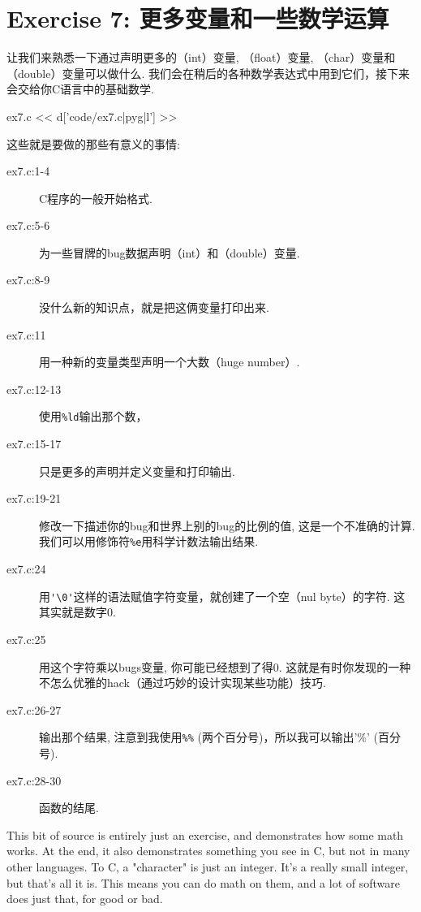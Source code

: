 \chapter{Exercise 7: 更多变量和一些数学运算}

让我们来熟悉一下通过声明更多的（int）变量, （float）变量, （char）变量和（double）变量可以做什么. 我们会在稍后的各种数学表达式中用到它们，接下来会交给你C语言中的基础数学.

\begin{code}{ex7.c}
<< d['code/ex7.c|pyg|l'] >>
\end{code}

这些就是要做的那些有意义的事情:

\begin{description}
\item[ex7.c:1-4] C程序的一般开始格式.
\item[ex7.c:5-6] 为一些冒牌的bug数据声明（int）和（double）变量.
\item[ex7.c:8-9] 没什么新的知识点，就是把这俩变量打印出来.
\item[ex7.c:11] 用一种新的变量类型声明一个大数（huge number）.
\item[ex7.c:12-13] 使用\verb|%ld|输出那个数， %
\item[ex7.c:15-17] 只是更多的声明并定义变量和打印输出.
\item[ex7.c:19-21] 修改一下描述你的bug和世界上别的bug的比例的值, 这是一个不准确的计算.  我们可以用修饰符\verb|%e|用科学计数法输出结果.
\item[ex7.c:24] 用\verb|'\0'|这样的语法赋值字符变量，就创建了一个空（nul byte）的字符.  这其实就是数字0.
\item[ex7.c:25] 用这个字符乘以bugs变量, 你可能已经想到了得0. 这就是有时你发现的一种不怎么优雅的hack（通过巧妙的设计实现某些功能）技巧.
\item[ex7.c:26-27] 输出那个结果, 注意到我使用\verb|%%| (两个百分号)，所以我可以输出'\%' (百分号).
\item[ex7.c:28-30] 函数的结尾.
\end{description}

This bit of source is entirely just an exercise, and demonstrates how
some math works.  At the end, it also demonstrates something you
see in C, but not in many other languages.  To C, a "character" is just an
integer.  It's a really small integer, but that's all it is.  This means
you can do math on them, and a lot of software does just that, for good
or bad.

